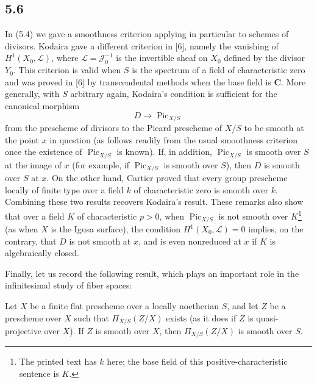 \subsection*{5.6}

In (5.4) we gave a smoothness criterion applying in particular to schemes of
divisors. Kodaira gave a different criterion in [6], namely the vanishing of
$H^1(X_0,\mathcal L)$, where $\mathcal L=\mathcal J_0^{-1}$ is the invertible
sheaf on $X_0$ defined by the divisor $Y_0$. This criterion is valid when $S$
is the spectrum of a field of characteristic zero and was proved in [6] by
transcendental methods when the base field is $\mathbf C$. More generally, with
$S$ arbitrary again, Kodaira's condition is sufficient for the canonical
morphism
\[
D\longrightarrow\operatorname{Pic}_{X/S}
\]
from the prescheme of divisors to the Picard prescheme of $X/S$ to be smooth at
the point $x$ in question (as follows readily from the usual smoothness
criterion once the existence of $\operatorname{Pic}_{X/S}$ is known). If, in
addition, $\operatorname{Pic}_{X/S}$ is smooth over $S$ at the image of $x$
(for example, if $\operatorname{Pic}_{X/S}$ is smooth over $S$), then $D$ is
smooth over $S$ at $x$. On the other hand, Cartier proved that every group
prescheme locally of finite type over a field $k$ of characteristic zero is
smooth over $k$. Combining these two results recovers Kodaira's result. These
remarks also show that over a field $K$ of characteristic $p>0$, when
$\operatorname{Pic}_{X/S}$ is not smooth over $K$\footnote{The printed text has $k$ here; the base field of this positive-characteristic sentence is $K$.} (as when $X$ is the Igusa
surface), the condition $H^1(X_0,\mathcal L)=0$ implies, on the contrary, that
$D$ is not smooth at $x$, and is even nonreduced at $x$ if $K$ is algebraically
closed.

Finally, let us record the following result, which plays an important role in
the infinitesimal study of fiber spaces:

 Let $X$ be a finite flat prescheme over a locally
noetherian $S$, and let $Z$ be a prescheme over $X$ such that
$\Pi_{X/S}(Z/X)$ exists (as it does if $Z$ is quasi-projective over $X$). If
$Z$ is smooth over $X$, then $\Pi_{X/S}(Z/X)$ is smooth over $S$.

